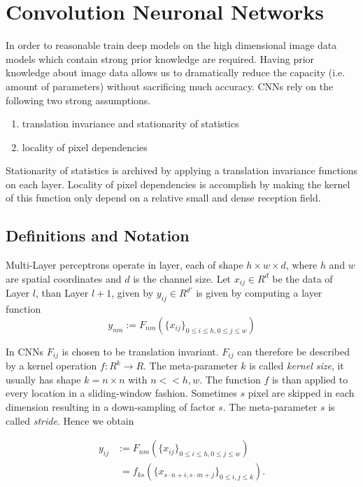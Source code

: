 \section{Convolution Neuronal Networks}\label{sec:cnn}

In order to reasonable train deep models on the high dimensional image data models which contain strong prior knowledge are required. Having prior knowledge about image data allows us to dramatically reduce the capacity (i.e. amount of parameters) without sacrificing much accuracy. CNNs rely on the following two strong assumptions.

\begin{enumerate}
    \item translation invariance and stationarity of statistics
	\item locality of pixel dependencies
\end{enumerate}

Stationarity of statistics is archived by applying a translation invariance functions on each layer. Locality of pixel dependencies is accomplish by making the kernel of this function only depend on a relative small and dense reception field. 

\subsection{Definitions and Notation} \label{sec:cnn_not}

Multi-Layer perceptrons operate in layer, each of shape $h \times w \times d$, where $h$ and $w$ are spatial coordinates and $d$ is the channel size. Let $x_{ij} \in R^d$ be the data of Layer $l$, than Layer $l+1$, given by $y_{ij} \in R^{d'}$ is given by computing a layer function 
\begin{equation*}
y_{nm} := F_{nm} (\{ x_{ij} \}_{0 \leq i \leq h, 0 \leq j \leq w}   )
\end{equation*}

In CNNs $F_{ij}$ is chosen to be translation invariant. $F_{ij}$ can therefore be described by a kernel  operation $f: R^k \rightarrow R$. The meta-parameter $k$ is called \emph{kernel size}, it usually has shape $k = n \times n$ with $n << h,w$.  The function $f$ is than applied to every location in a sliding-window fashion. Sometimes $s$ pixel are skipped in each dimension resulting in a down-sampling of factor $s$. The meta-parameter $s$ is called \emph{stride}. Hence we obtain

\begin{align*}
y_{ij} &:= F_{nm} (\{ x_{ij} \}_{0 \leq i \leq h, 0 \leq j \leq w}   ) \\&\; = f_{ks} (\{x_{s \cdot n + i, s \cdot m + j}  \}_{0 \leq i,j \leq k} ).
\end{align*}

